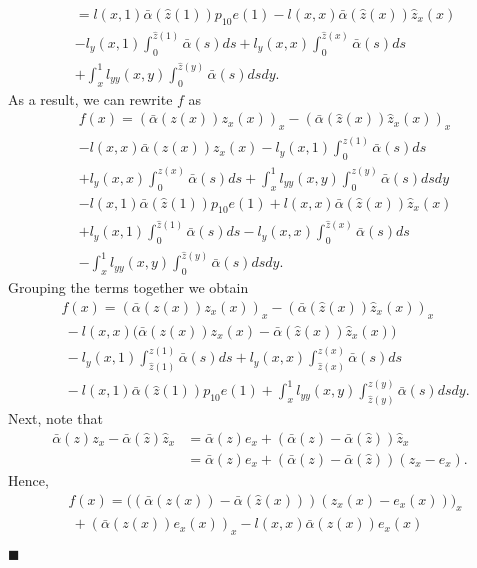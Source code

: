 \documentclass[twocolumn]{autart}
\newenvironment{proof}{{\it Proof. }}{\hfill $\blacksquare$ }
\begin{document}
\begin{proof}
\begin{align*}
&= l(x,1)\bar{\alpha}(\hat{z}(1))p_{10}e(1) - l(x,x)\bar{\alpha}(\hat{z}(x))\hat{z}_x(x) \nonumber \\
&- l_y(x,1)\int_{0}^{\hat{z}(1)}\bar{\alpha}(s)ds+l_y(x,x)\int_{0}^{\hat{z}(x)}\bar{\alpha}(s)ds \\
&+\int_{x}^{1}l_{yy}(x,y)\int_{0}^{\hat{z}(y)}\bar{\alpha}(s)ds dy.
\end{align*}
As a result, we can rewrite $f$ as 
\begin{align*}
&f(x) = (\bar{\alpha}(z(x))z_x(x))_x-(\bar{\alpha}(\hat{z}(x))\hat{z}_x(x))_x \\
& - l(x,x)\bar{\alpha}(z(x))z_x(x) - l_y(x,1)\int_{0}^{z(1)}\bar{\alpha}(s)ds \nonumber \\
&+l_y(x,x)\int_{0}^{z(x)}\bar{\alpha}(s)ds+\int_{x}^{1}l_{yy}(x,y)\int_{0}^{z(y)}\bar{\alpha}(s)ds dy \\
& -l(x,1)\bar{\alpha}(\hat{z}(1))p_{10}e(1) + l(x,x)\bar{\alpha}(\hat{z}(x))\hat{z}_x(x)\\
&+ l_y(x,1)\int_{0}^{\hat{z}(1)}\bar{\alpha}(s)ds-l_y(x,x)\int_{0}^{\hat{z}(x)}\bar{\alpha}(s)ds \\
&-\int_{x}^{1}l_{yy}(x,y)\int_{0}^{\hat{z}(y)}\bar{\alpha}(s)ds dy. 
\end{align*}
Grouping the terms together we obtain 
\begin{align*}
&f(x) = (\bar{\alpha}(z(x))z_x(x))_x-(\bar{\alpha}(\hat{z}(x))\hat{z}_x(x))_x \\
&~-l(x,x)\bigg(\bar{\alpha}(z(x))z_x(x)-\bar{\alpha}(\hat{z}(x))\hat{z}_x(x)\bigg)\\
&~-l_y(x,1)\int_{\hat{z}(1)}^{z(1)}\bar{\alpha}(s)ds +l_y(x,x)\int_{\hat{z}(x)}^{z(x)}\bar{\alpha}(s)ds \\
&~-l(x,1)\bar{\alpha}(\hat{z}(1))p_{10}e(1) +\int_{x}^{1}l_{yy}(x,y)\int_{\hat{z}(y)}^{z(y)}\bar{\alpha}(s)dsdy. 
\end{align*}
Next, note that 
\begin{align*}
\bar{\alpha}(z)z_x-\bar{\alpha}(\hat{z})\hat{z}_x &= \bar{\alpha}(z)e_x +\left(\bar{\alpha}(z)-\bar{\alpha}(\hat{z})\right)\hat{z}_x \\
&= \bar{\alpha}(z)e_x +\left(\bar{\alpha}(z)-\bar{\alpha}(\hat{z})\right)(z_x-e_x).
\end{align*}
Hence, 
\begin{align*}
&f(x) = \big(\left(\bar{\alpha}(z(x))-\bar{\alpha}(\hat{z}(x))\right)(z_x(x)-e_x(x))\big)_x \\
&~+ \left(\bar{\alpha}(z(x))e_x(x)\right)_x-l(x,x)\bar{\alpha}(z(x))e_x(x)\\

\end{align*}
\end{proof}
\end{document}
